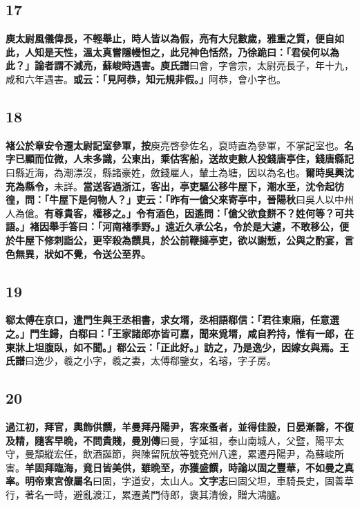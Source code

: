 \subsection*{17}

\textbf{庾太尉風儀偉長，不輕舉止，時人皆以為假，亮有大兒數歲，雅重之質，便自如此，人知是天性，溫太真嘗隱幔怛之，此兒神色恬然，乃徐跪曰：「君侯何以為此？」論者謂不減亮，蘇峻時遇害。}{\footnotesize \textbf{庾氏譜}曰會，字會宗，太尉亮長子，年十九，咸和六年遇害。}\textbf{或云：「見阿恭，知元規非假。」}{\footnotesize 阿恭，會小字也。}

\subsection*{18}

\textbf{褚公於章安令遷太尉記室參軍，}{\footnotesize \textbf{按}庾亮啓參佐名，裒時直為參軍，不掌記室也。}\textbf{名字已顯而位微，人未多識，公東出，乘估客船，送故吏數人投錢唐亭住，}{\footnotesize \textbf{錢唐縣記}曰縣近海，為潮漂沒，縣諸豪姓，斂錢雇人，輦土為塘，因以為名也。}\textbf{爾時吳興沈充為縣令，}{\footnotesize 未詳。}\textbf{當送客過浙江，客出，亭吏驅公移牛屋下，潮水至，沈令起彷徨，問：「牛屋下是何物人？」吏云：「昨有一傖父來寄亭中，}{\footnotesize \textbf{晉陽秋}曰吳人以中州人為傖。}\textbf{有尊貴客，權移之。」令有酒色，因遙問：「傖父欲食䴵不？姓何等？可共語。」褚因舉手答曰：「河南褚季野。」遠近久承公名，令於是大遽，不敢移公，便於牛屋下修刺詣公，更宰殺為饌具，於公前鞭撻亭吏，欲以謝慙，公與之酌宴，言色無異，狀如不覺，令送公至界。}

\subsection*{19}

\textbf{郗太傅在京口，遣門生與王丞相書，求女壻，丞相語郗信：「君往東廂，任意選之。」門生歸，白郗曰：「王家諸郎亦皆可嘉，聞來覓壻，咸自矜持，惟有一郎，在東牀上坦腹臥，如不聞。」郗公云：「正此好。」訪之，乃是逸少，因嫁女與焉。}{\footnotesize \textbf{王氏譜}曰逸少，羲之小字，羲之妻，太傅郗鑒女，名璿，字子房。}

\subsection*{20}

\textbf{過江初，拜官，輿飾供饌，羊曼拜丹陽尹，客來蚤者，並得佳設，日晏漸罄，不復及精，隨客早晩，不問貴賤，}{\footnotesize \textbf{曼別傳}曰曼，字延祖，泰山南城人，父暨，陽平太守，曼頽縱宏任，飲酒誕節，與陳留阮放等號兗州八達，累遷丹陽尹，為蘇峻所害。}\textbf{羊固拜臨海，竟日皆美供，雖晩至，亦獲盛饌，時論以固之豐華，不如曼之真率。}{\footnotesize \textbf{明帝東宮僚屬名}曰固，字道安，太山人。\textbf{文字志}曰固父坦，車騎長史，固善草行，著名一時，避亂渡江，累遷黃門侍郎，褒其清儉，贈大鴻臚。}

